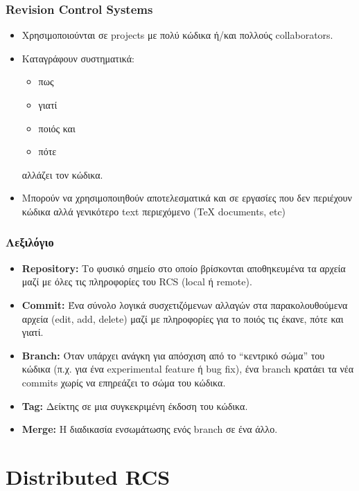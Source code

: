 \documentclass[handout]{beamer}
\begin{document}
\begin{frame}
  \frametitle{Revision Control Systems}
  \begin{itemize}
    \item Χρησιμοποιούνται σε projects με πολύ κώδικα ή/και πολλούς
      collaborators.
    \item Καταγράφουν συστηματικά:
      \begin{itemize}
        \item πως
        \item γιατί
        \item ποιός και
        \item πότε
      \end{itemize}
      αλλάζει τον κώδικα.
    \item Μπορούν να χρησιμοποιηθούν αποτελεσματικά και σε εργασίες που δεν
      περιέχουν κώδικα αλλά γενικότερο text περιεχόμενο (\TeX{} documents,
      etc)
  \end{itemize}
\end{frame}

\begin{frame}
  \frametitle{Λεξιλόγιο}
  \begin{itemize}
  \item \textbf{Repository:} Το φυσικό σημείο στο οποίο βρίσκονται αποθηκευμένα
    τα αρχεία μαζί με όλες τις πληροφορίες του RCS (local ή remote).
  \item \textbf{Commit:} Ένα σύνολο λογικά συσχετιζόμενων αλλαγών στα
    παρακολουθούμενα αρχεία (edit, add, delete) μαζί με πληροφορίες για το ποιός
    τις έκανε, πότε και γιατί.
  \item \textbf{Branch:} Όταν υπάρχει ανάγκη για απόσχιση από το ``κεντρικό
    σώμα'' του κώδικα (π.χ. για ένα experimental feature ή bug fix), ένα branch
    κρατάει τα νέα commits χωρίς να επηρεάζει το σώμα του κώδικα.
  \item \textbf{Tag:} Δείκτης σε μια συγκεκριμένη έκδοση του κώδικα.
  \item \textbf{Merge:} Η διαδικασία ενσωμάτωσης ενός branch σε ένα άλλο.
  \end{itemize}
\end{frame}

\section{Distributed RCS}
\end{document}
